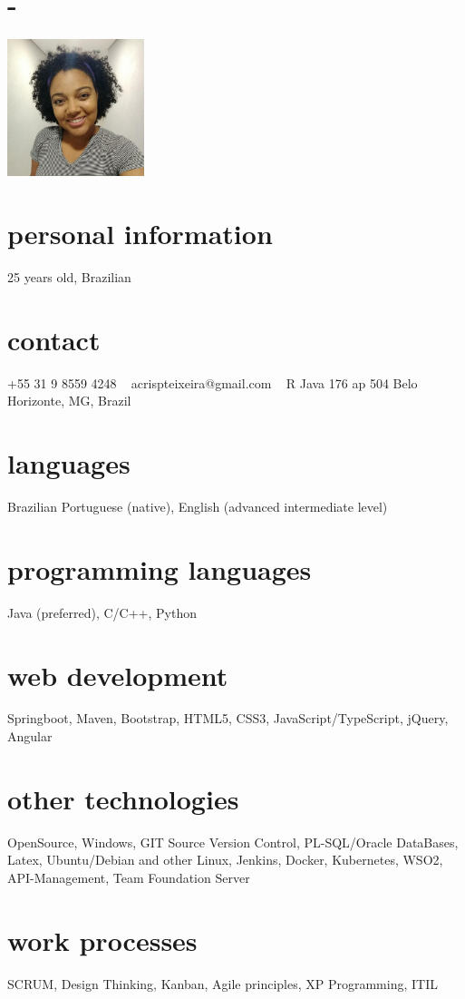 \documentclass[portuguese]{cv-style}     %
\begin{document}
\lastupdated

\begin{aside}
\section{-}
\includegraphics[width=4cm]{op02}
%
\section{personal information}
25 years old, Brazilian
%
\section{contact}
+55 31 9 8559 4248
~
acrispteixeira@gmail.com
~
R Java 176 ap 504
Belo Horizonte, MG, Brazil
%
\section{languages}
Brazilian Portuguese (native),
English (advanced intermediate level)
%
\section{programming languages}
Java (preferred), C/C++, Python
%
\section{web development}
Springboot, Maven, Bootstrap, HTML5, CSS3, JavaScript/TypeScript, jQuery, Angular
%
\section{other technologies}
OpenSource, Windows, GIT Source Version Control, PL-SQL/Oracle DataBases, Latex, Ubuntu/Debian and other Linux, Jenkins, Docker, Kubernetes, WSO2, API-Management, Team Foundation Server
%
\section{work processes}
SCRUM, Design Thinking, Kanban, Agile principles, XP Programming, ITIL
%
\end{aside}
\vspace{0.2cm}
\end{document}
